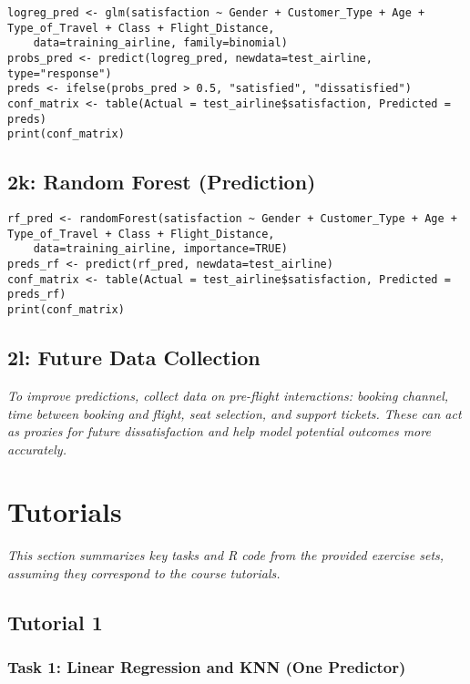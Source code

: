 \documentclass[12pt,a4paper]{article}
\begin{document}
\begin{lstlisting}[caption={2j: Logistic Regression - Prediction}]
logreg_pred <- glm(satisfaction ~ Gender + Customer_Type + Age + Type_of_Travel + Class + Flight_Distance,
    data=training_airline, family=binomial)
probs_pred <- predict(logreg_pred, newdata=test_airline, type="response")
preds <- ifelse(probs_pred > 0.5, "satisfied", "dissatisfied")
conf_matrix <- table(Actual = test_airline$satisfaction, Predicted = preds)
print(conf_matrix)
\end{lstlisting}

\subsection{2k: Random Forest (Prediction)}

\begin{lstlisting}[caption={2k: Random Forest - Prediction}]
rf_pred <- randomForest(satisfaction ~ Gender + Customer_Type + Age + Type_of_Travel + Class + Flight_Distance,
    data=training_airline, importance=TRUE)
preds_rf <- predict(rf_pred, newdata=test_airline)
conf_matrix <- table(Actual = test_airline$satisfaction, Predicted = preds_rf)
print(conf_matrix)
\end{lstlisting}

\subsection{2l: Future Data Collection}

\textit{To improve predictions, collect data on pre-flight interactions: booking channel, time between booking and flight, seat selection, and support tickets. These can act as proxies for future dissatisfaction and help model potential outcomes more accurately.}



\section{Tutorials}
    \textit{This section summarizes key tasks and R code from the provided exercise sets, assuming they correspond to the course tutorials.}

    \subsection{Tutorial 1 }
        \subsubsection{Task 1: Linear Regression and KNN (One Predictor)}
\end{document}
